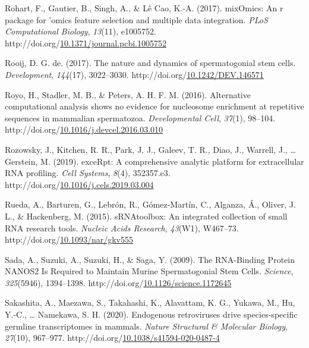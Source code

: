 \documentclass[12pt,twoside]{reedthesis}
\newlength{\cslhangindent}
\newenvironment{CSLReferences}[2] %
 {%
  \setlength{\parindent}{0pt}
  \ifodd #1 \everypar{\setlength{\hangindent}{\cslhangindent}}\ignorespaces\fi
  \ifnum #2 > 0
  \setlength{\parskip}{#2\baselineskip}
  \fi
 }%
 {}
\begin{document}
\begin{CSLReferences}{1}{0}
\leavevmode{}%
Rohart, F., Gautier, B., Singh, A., \& Lê Cao, K.-A. (2017). mixOmics: An r package for 'omics feature selection and multiple data integration. \emph{PLoS Computational Biology}, \emph{13}(11), e1005752. http://doi.org/\href{https://doi.org/10.1371/journal.pcbi.1005752}{10.1371/journal.pcbi.1005752}

\leavevmode{}%
Rooij, D. G. de. (2017). The nature and dynamics of spermatogonial stem cells. \emph{Development}, \emph{144}(17), 3022--3030. http://doi.org/\href{https://doi.org/10.1242/DEV.146571}{10.1242/DEV.146571}

\leavevmode{}%
Royo, H., Stadler, M. B., \& Peters, A. H. F. M. (2016). Alternative computational analysis shows no evidence for nucleosome enrichment at repetitive sequences in mammalian spermatozoa. \emph{Developmental Cell}, \emph{37}(1), 98--104. http://doi.org/\href{https://doi.org/10.1016/j.devcel.2016.03.010}{10.1016/j.devcel.2016.03.010}

\leavevmode{}%
Rozowsky, J., Kitchen, R. R., Park, J. J., Galeev, T. R., Diao, J., Warrell, J., \ldots{} Gerstein, M. (2019). exceRpt: A comprehensive analytic platform for extracellular RNA profiling. \emph{Cell Systems}, \emph{8}(4), 352357.e3. http://doi.org/\href{https://doi.org/10.1016/j.cels.2019.03.004}{10.1016/j.cels.2019.03.004}

\leavevmode{}%
Rueda, A., Barturen, G., Lebrón, R., Gómez-Martín, C., Alganza, Á., Oliver, J. L., \& Hackenberg, M. (2015). sRNAtoolbox: An integrated collection of small RNA research tools. \emph{Nucleic Acids Research}, \emph{43}(W1), W467--73. http://doi.org/\href{https://doi.org/10.1093/nar/gkv555}{10.1093/nar/gkv555}

\leavevmode{}%
Sada, A., Suzuki, A., Suzuki, H., \& Saga, Y. (2009). The RNA-Binding Protein NANOS2 Is Required to Maintain Murine Spermatogonial Stem Cells. \emph{Science}, \emph{325}(5946), 1394--1398. http://doi.org/\href{https://doi.org/10.1126/science.1172645}{10.1126/science.1172645}

\leavevmode{}%
Sakashita, A., Maezawa, S., Takahashi, K., Alavattam, K. G., Yukawa, M., Hu, Y.-C., \ldots{} Namekawa, S. H. (2020). Endogenous retroviruses drive species-specific germline transcriptomes in mammals. \emph{Nature Structural \& Molecular Biology}, \emph{27}(10), 967--977. http://doi.org/\href{https://doi.org/10.1038/s41594-020-0487-4}{10.1038/s41594-020-0487-4}


\end{CSLReferences}
\end{document}
